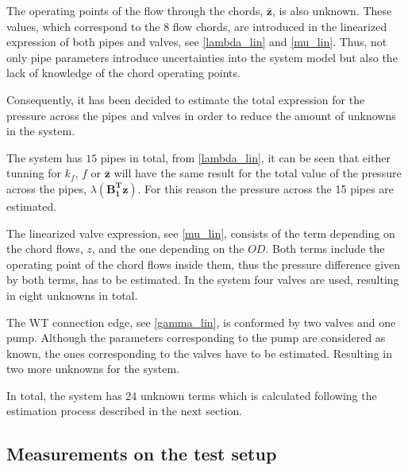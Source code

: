 %


The operating points of the flow through the chords, $\bm{\bar{z}}$, is also unknown. These values, which correspond to the $8$ flow chords, are introduced in the linearized expression of both pipes 
and valves, see \eqref{lambda_lin} and \eqref{mu_lin}. Thus, not only pipe parameters introduce uncertainties into the system model but also the lack of knowledge of the chord operating points.

Consequently, it has been decided to estimate the total expression for the pressure across the pipes and valves in order to reduce the amount of unknowns in the system.

The system has $15$ pipes in total, from \eqref{lambda_lin}, it can be seen that either tunning for $k_f$, $f$ or $\bm{\bar{z}}$ will have the same result for the total
value of the pressure across the pipes, $\lambda(\bm{{B_1^{T}}}\bm{z})$. For this reason the pressure across the 15 pipes are estimated.

The linearized valve expression, see \eqref{mu_lin}, consists of the term depending on the chord flows, $z$, and the one depending on the $OD$. Both terms include the operating 
point of the chord flows inside them, thus the pressure difference given by both terms, has to be estimated. In the system four valves are used, resulting in eight unknowns in total. 

The WT connection edge, see \eqref{gamma_lin}, is conformed by two valves and one pump. Although the parameters corresponding to the pump are considered as known, the ones 
corresponding to the valves have to be estimated. Resulting in two more unknowns for the system. 

In total, the system has $24$ unknown terms which is calculated following the estimation process described in the next section.
\subsection{Measurements on the test setup}
\label{LinParamEst_measurements}

